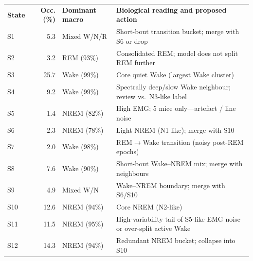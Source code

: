 \begin{tabular}{|l|r|l|p{5.8cm}|}
\hline
\textbf{State} & \textbf{Occ. (\%)} & \textbf{Dominant macro} & \textbf{Biological reading and proposed action} \\
\thickhline
S1 & 5.3 & Mixed W/N/R & Short-bout transition bucket; merge with S6 or drop \\
S2 & 3.2 & REM (93\%) & Consolidated REM; model does not split REM further \\
S3 & 25.7 & Wake (99\%) & Core quiet Wake (largest Wake cluster) \\
S4 & 9.2 & Wake (99\%) & Spectrally deep/slow Wake neighbour; review vs.\ N3-like label \\
S5 & 1.4 & NREM (82\%) & High EMG; 5 mice only---artefact / line noise \\
S6 & 2.3 & NREM (78\%) & Light NREM (N1-like); merge with S10 \\
S7 & 2.0 & Wake (98\%) & REM$\to$Wake transition (noisy post-REM epochs) \\
S8 & 7.6 & Wake (90\%) & Short-bout Wake--NREM mix; merge with neighbours \\
S9 & 4.9 & Mixed W/N & Wake--NREM boundary; merge with S6/S10 \\
S10 & 12.6 & NREM (94\%) & Core NREM (N2-like) \\
S11 & 11.5 & NREM (95\%) & High-variability tail of S5-like EMG noise or over-split active Wake \\
S12 & 14.3 & NREM (94\%) & Redundant NREM bucket; collapse into S10 \\
\hline
\end{tabular}
